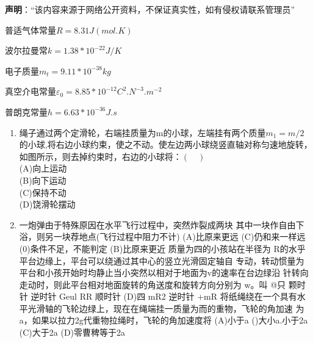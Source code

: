 
\textbf{声明}：“该内容来源于网络公开资料，不保证真实性，如有侵权请联系管理员”

普适气体常量$R=8.31J(mol.K)$

波尔拉曼常$k=1.38*10^{-22} J/K$

电子质量$m_t=9.11*10^{-38}kg$

真空介电常量$\varepsilon_0=8.85*10^{-12}C^2.N^{-3}.m^{-2}$

普朗克常量$h=6.63*10^{-36}J.s$

\begin{enumerate}
\item 绳子通过两个定滑轮，右端挂质量为m的小球，左端挂有两个质量$m_1=m/2$的小球,将右边小球约束，使之不动。使左边两小球绕竖直轴对称匀速地旋转，如图所示，则去掉约束时，右边的小球将：$(\quad)$\\
(A)向上运动\\
(B)向下运动\\
(C)保持不动\\
(D)饶滑轮摆动
\item 一炮弹由于特殊原因在水平飞行过程中，突然炸裂成两块
其中一块作自由下浴，则另一块荐地点(飞行过程中阻力不计)
(A)比原来更远
(C)仍和来一样远
(0)条件不足，不能判定
(B)比原来更近
质量为四的小孩站在半径为 R的水乎平台边缘上，平台可以绕通过其中心的竖立光滑固定轴自
专动，转动惯量为平台和小孩开始时均静止当小突然以相对于地面为v的速率在台边绿沿
针转向走动时，则此平台相对地面旋转的角送度和旋转方向分别为
w。叫
@只
颗时针
逆时针
Geul
RR
顺时针 (D)四
mR2
逆时针
+mR
将纸绳绕在一个具有水平光滑轴的飞轮边绿上，现在在绳端挂一质量为而的重物，飞轮的角加速
为a，如果以拉力2g代重物拉绳时，飞轮的角加速度将
(A)小于a
()大小a.小于2a
(C)大于2a
(D)零曹稗等于2a
\end{enumerate}
